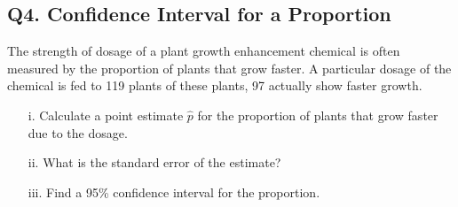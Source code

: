 \documentclass[a4paper,12pt]{article}
\begin{document}
\subsection*{Q4. Confidence Interval for a Proportion}
The strength of dosage of a plant growth enhancement chemical is often measured by the proportion of plants that grow faster. A particular dosage of the chemical is fed to 119 plants of these plants, 97 actually show faster growth.

\begin{itemize}
	\item[i.]  Calculate a point estimate $\hat{p}$ for the proportion of plants that grow faster due to the dosage. 									 
	\item[ii.]  What is the standard error of the estimate? 			
	\item[iii.] Find a 95\% confidence interval for the proportion. 					
\end{itemize}
\newpage
\end{document}
